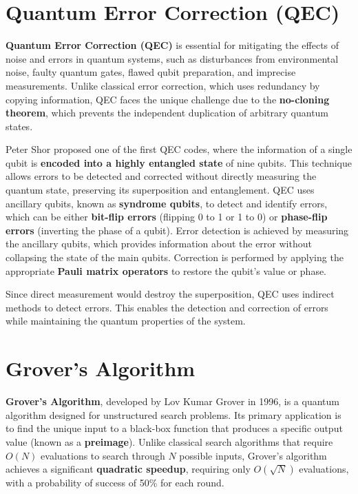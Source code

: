 \section{Quantum Error Correction (QEC)}

\textbf{Quantum Error Correction (QEC)} is essential for mitigating
the effects of noise and errors in quantum systems, such as
disturbances from environmental noise, faulty quantum gates, flawed
qubit preparation, and imprecise measurements. Unlike classical error
correction, which uses redundancy by copying information, QEC faces
the unique challenge due to the \textbf{no-cloning theorem}, which
prevents the independent duplication of arbitrary quantum states.

Peter Shor proposed one of the first QEC codes, where the information
of a single qubit is \textbf{encoded into a highly entangled state} of
nine qubits. This technique allows errors to be detected and corrected
without directly measuring the quantum state, preserving its
superposition and entanglement. QEC uses ancillary qubits, known as
\textbf{syndrome qubits}, to detect and identify errors, which can be
either \textbf{bit-flip errors} (flipping 0 to 1 or 1 to 0) or
\textbf{phase-flip errors} (inverting the phase of a qubit). Error
detection is achieved by measuring the ancillary qubits, which
provides information about the error without collapsing the state of
the main qubits. Correction is performed by applying the appropriate
\textbf{Pauli matrix operators} to restore the qubit's value or phase.

Since direct measurement would destroy the superposition, QEC uses
indirect methods to detect errors. This enables the detection and
correction of errors while maintaining the quantum properties of the
system.

\section{Grover's Algorithm}

\textbf{Grover's Algorithm}, developed by Lov Kumar Grover in 1996, is
a quantum algorithm designed for unstructured search problems. Its
primary application is to find the unique input to a black-box
function that produces a specific output value (known as a
\textbf{preimage}). Unlike classical search algorithms that require
\(O(N)\) evaluations to search through \(N\) possible inputs, Grover's
algorithm achieves a significant \textbf{quadratic speedup}, requiring
only \(O(\sqrt{N})\) evaluations, with a probability of success of
50\% for each round.

